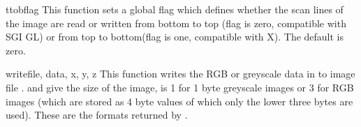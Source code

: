 \begin{funcdesc}{ttob}{flag}
This function sets a global flag which defines whether the scan lines
of the image are read or written from bottom to top (flag is zero,
compatible with SGI GL) or from top to bottom(flag is one,
compatible with X).  The default is zero.
\end{funcdesc}

\begin{funcdesc}{write}{file, data, x, y, z}
This function writes the RGB or greyscale data in  to image
file .  and  give the size of the image,
 is 1 for 1 byte greyscale images or 3 for RGB images (which are
stored as 4 byte values of which only the lower three bytes are used).
These are the formats returned by .
\end{funcdesc}
